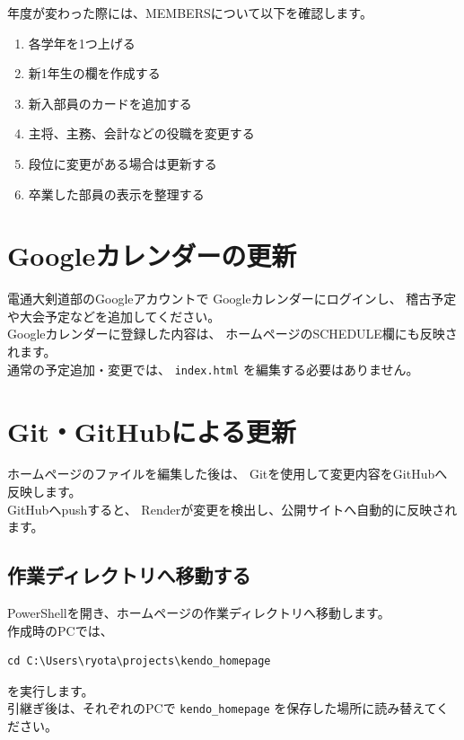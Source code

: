 \documentclass[a4paper,11pt]{ltjsarticle}
\begin{document}
年度が変わった際には、MEMBERSについて以下を確認します。

\begin{enumerate}
  \item 各学年を1つ上げる
  \item 新1年生の欄を作成する
  \item 新入部員のカードを追加する
  \item 主将、主務、会計などの役職を変更する
  \item 段位に変更がある場合は更新する
  \item 卒業した部員の表示を整理する
\end{enumerate}


\section{Googleカレンダーの更新}

電通大剣道部のGoogleアカウントで
Googleカレンダーにログインし、
稽古予定や大会予定などを追加してください。\\
Googleカレンダーに登録した内容は、
ホームページのSCHEDULE欄にも反映されます。\\
通常の予定追加・変更では、
\texttt{index.html} を編集する必要はありません。


\section{Git・GitHubによる更新}

ホームページのファイルを編集した後は、
Gitを使用して変更内容をGitHubへ反映します。\\
GitHubへpushすると、
Renderが変更を検出し、公開サイトへ自動的に反映されます。


\subsection{作業ディレクトリへ移動する}

PowerShellを開き、ホームページの作業ディレクトリへ移動します。\\
作成時のPCでは、

\begin{lstlisting}
cd C:\Users\ryota\projects\kendo_homepage
\end{lstlisting}

を実行します。\\
引継ぎ後は、それぞれのPCで
\texttt{kendo\_homepage} を保存した場所に読み替えてください。
\end{document}
